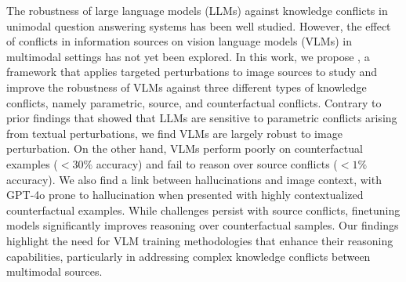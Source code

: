 




The robustness of large language models (LLMs) against knowledge conflicts in unimodal question answering systems has been well studied. However, the effect of conflicts in information sources on vision language models (VLMs) in multimodal settings has not yet been explored. In this work, we propose \segsub, a framework that applies targeted perturbations to image sources to study and improve the robustness of VLMs against three different types of knowledge conflicts, namely parametric, source, and counterfactual conflicts.
Contrary to prior findings that showed that LLMs are sensitive to parametric conflicts arising from textual perturbations, we find VLMs are largely robust to image perturbation. On the other hand, VLMs perform poorly on counterfactual examples ($<30\%$ accuracy) and fail to reason over source conflicts ($<1\%$ accuracy). We also find a link between hallucinations and image context, with GPT-4o prone to hallucination when presented with highly contextualized counterfactual examples.
While challenges persist with source conflicts, finetuning models  significantly improves reasoning over counterfactual samples. Our findings highlight the need for VLM training methodologies that enhance their reasoning capabilities, particularly in addressing complex knowledge conflicts between multimodal sources.